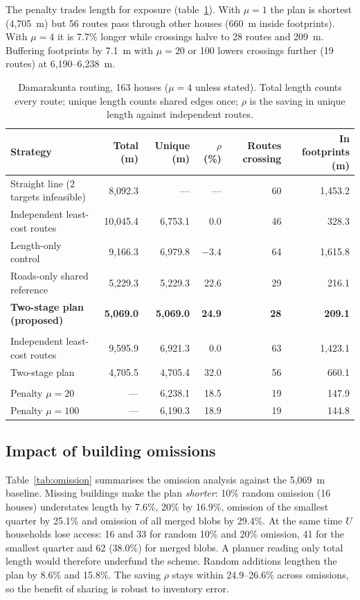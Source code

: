 \documentclass[12pt,a4paper]{article}
\begin{document}
The penalty trades length for exposure (table~\ref{tab:routing}). With $\mu=1$ the plan is shortest (4{,}705~m) but 56 routes pass through other houses (660~m inside footprints). With $\mu=4$ it is 7.7\% longer while crossings halve to 28 routes and 209~m. Buffering footprints by 7.1~m with $\mu=20$ or 100 lowers crossings further (19 routes) at 6{,}190--6{,}238~m.

\begin{table}[t]
\caption{Damarakunta routing, 163 houses ($\mu=4$ unless stated). Total length counts every route; unique length counts shared edges once; $\rho$ is the saving in unique length against independent routes.}
\label{tab:routing}
\centering
\footnotesize
\begin{tabular}{@{}>{\raggedright\arraybackslash}p{4.3cm}rrrrr@{}}
\toprule
Strategy & Total (m) & Unique (m) & $\rho$ (\%) & Routes crossing & In footprints (m)\\
\midrule
Straight line (2 targets infeasible) & 8{,}092.3 & --- & --- & 60 & 1{,}453.2\\
Independent least-cost routes & 10{,}045.4 & 6{,}753.1 & 0.0 & 46 & 328.3\\
Length-only control & 9{,}166.3 & 6{,}979.8 & $-3.4$ & 64 & 1{,}615.8\\
Roads-only shared reference & 5{,}229.3 & 5{,}229.3 & 22.6 & 29 & 216.1\\
\textbf{Two-stage plan (proposed)} & \textbf{5{,}069.0} & \textbf{5{,}069.0} & \textbf{24.9} & \textbf{28} & \textbf{209.1}\\
\midrule
\multicolumn{6}{@{}l}{\textit{No footprint penalty ($\mu=1$)}}\\
Independent least-cost routes & 9{,}595.9 & 6{,}921.3 & 0.0 & 63 & 1{,}423.1\\
Two-stage plan & 4{,}705.5 & 4{,}705.4 & 32.0 & 56 & 660.1\\
\midrule
\multicolumn{6}{@{}l}{\textit{Buffered footprints (7.1~m), two-stage plan}}\\
Penalty $\mu=20$ & --- & 6{,}238.1 & 18.5 & 19 & 147.9\\
Penalty $\mu=100$ & --- & 6{,}190.3 & 18.9 & 19 & 144.8\\
\bottomrule
\end{tabular}
\end{table}

\subsection{Impact of building omissions}
Table~\ref{tab:omission} summarises the omission analysis against the 5{,}069~m baseline. Missing buildings make the plan \emph{shorter}: 10\% random omission (16 houses) understates length by 7.6\%, 20\% by 16.9\%, omission of the smallest quarter by 25.1\% and omission of all merged blobs by 29.4\%. At the same time $U$ households lose access: 16 and 33 for random 10\% and 20\% omission, 41 for the smallest quarter and 62 (38.0\%) for merged blobs. A planner reading only total length would therefore underfund the scheme. Random additions lengthen the plan by 8.6\% and 15.8\%. The saving $\rho$ stays within 24.9--26.6\% across omissions, so the benefit of sharing is robust to inventory error.
\end{document}
